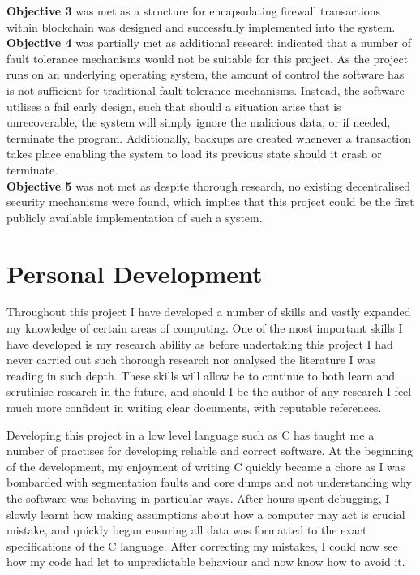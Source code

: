 \documentclass[a4paper, 11pt]{report}
\begin{document}
\textbf{Objective 3} was met as a structure for encapsulating firewall transactions within blockchain was designed and successfully implemented into the system.\\

\textbf{Objective 4} was partially met as additional research indicated that a number of fault tolerance mechanisms would not be suitable for this project. As the project runs on an underlying operating system, the amount of control the software has is not sufficient for traditional fault tolerance mechanisms. Instead, the software utilises a fail early design, such that should a situation arise that is unrecoverable, the system will simply ignore the malicious data, or if needed, terminate the program. Additionally, backups are created whenever a transaction takes place enabling the system to load its previous state should it crash or terminate.\\

\textbf{Objective 5} was not met as despite thorough research, no existing decentralised security mechanisms were found, which implies that this project could be the first publicly available implementation of such a system.

\section{Personal Development}
Throughout this project I have developed a number of skills and vastly expanded my knowledge of certain areas of computing. One of the most important skills I have developed is my research ability as before undertaking this project I had never carried out such thorough research nor analysed the literature I was reading in such depth. These skills will allow be to continue to both learn and scrutinise research in the future, and should I be the author of any research I feel much more confident in writing clear documents, with reputable references.

Developing this project in a low level language such as C has taught me a number of practises for developing reliable and correct software. At the beginning of the development, my enjoyment of writing C quickly became a chore as I was bombarded with segmentation faults and core dumps and not understanding why the software was behaving in particular ways. After hours spent debugging, I slowly learnt how making assumptions about how a computer may act is crucial mistake, and quickly began ensuring all data was formatted to the exact specifications of the C language. After correcting my mistakes, I could now see how my code had let to unpredictable behaviour and now know how to avoid it.
\end{document}

